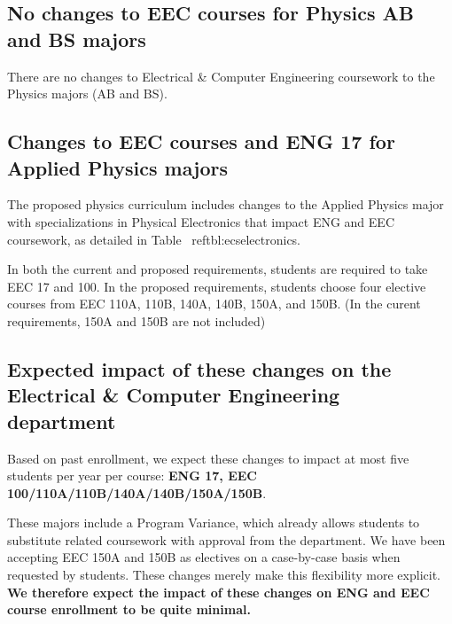 \documentclass[12pt]{article}
\begin{document}
\subsection{No changes to EEC courses for Physics AB and BS majors}

There are no changes to Electrical \& Computer Engineering coursework
to the Physics majors (AB and BS).

\subsection{Changes to EEC courses and ENG 17 for Applied Physics majors}

The proposed physics curriculum includes changes to the Applied
Physics major with specializations in Physical Electronics that impact
ENG and EEC coursework, as detailed in Table~ ref{tbl:ecselectronics}.

In both the current and proposed requirements, students are required
to take EEC 17 and 100.  In the proposed requirements, students choose
four elective courses from EEC 110A, 110B, 140A, 140B, 150A, and 150B.
(In the curent requirements, 150A and 150B are not included)

\subsection{Expected impact of these changes on the Electrical \& Computer Engineering department}

Based on past enrollment, we expect these changes to impact at most
five students per year per course:  {\bf ENG 17, EEC 100/110A/110B/140A/140B/150A/150B}.

These majors include a Program Variance, which already allows students
to substitute related coursework with approval from the department.
We have been accepting EEC 150A and 150B as electives on a
case-by-case basis when requested by students.  These changes merely
make this flexibility more explicit.
{\bf We therefore expect the impact of these changes on ENG and EEC
  course enrollment to be quite minimal.}
\end{document}
